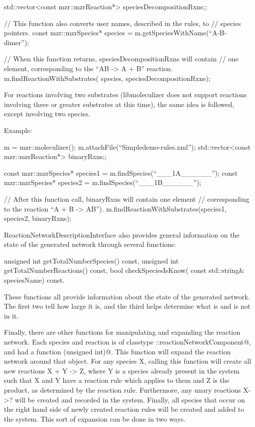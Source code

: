std::vector<const mzr::mzrReaction*> speciesDecompositionRxns;;

// This function also converts user names, described in the rules, to
// species pointers.
const mzr::mzrSpecies* species = m.getSpeciesWithName(``A-B-dimer'');

// When this function returns, speciesDecompositionRxns will contain
// one element, corresponding to the ``AB -> A + B'' reaction.  
m.findReactionWithSubstrates( species, speciesDecompositionRxns);

For reactions involving two substrates (libmoleculizer does not
support reactions involving three or greater substrates at this time),
the same idea is followed, except involving two species.  

Example:
\begin{LocalCPP}
m = mzr::moleculizer();
m.attachFile(``Simpledemo-rules.xml'');
std::vector<const mzr::mzrReaction*> binaryRxns;;

const mzr::mzrSpecies* species1 = m.findSpecies(``___1A______'');
const mzr::mzrSpecies* species2 = m.findSpecies(``___1B______'');

// After this function call, binaryRxns will contain one element
// corresponding to the reaction ``A + B -> AB'').
m.findReactionWithSubstrates(species1, species2, binaryRxns);


ReactionNetworkDescriptionInterface also provides general information
on the state of the generated network through several functions:

unsigned int getTotalNumberSpecies() const, 
unsigned int getTotalNumberReactions() const,
bool checkSpeciesIsKnow( const std::string& speciesName) const.
\end{LocalCPP}

These functions all provide information about the state of the
generated network.  The first two tell how large it is, and the third
helps determine what is and is not in it.  

Finally, there are other functions for manipulating and expanding the
reaction network.  Each species and reaction is of classtype
\lstinline@fnd::reactionNetworkComponent@, and had a function
\lstinline@expandReactionNetwork(unsigned int)@.  This function will expand the
reaction network around that object.  For any species X, calling this
function will create all new reactions X + Y -> Z, where Y is a species
already present in the system such that X and Y have a reaction rule
which applies to them and Z is the product, as determined by the
reaction rule.  Furthermore, any unary reactions X->? will be created
and recorded in the system.  Finally, all species that occur on the
right hand side of newly created reaction rules will be created and
added to the system.  This sort of expansion can be done in two ways.

